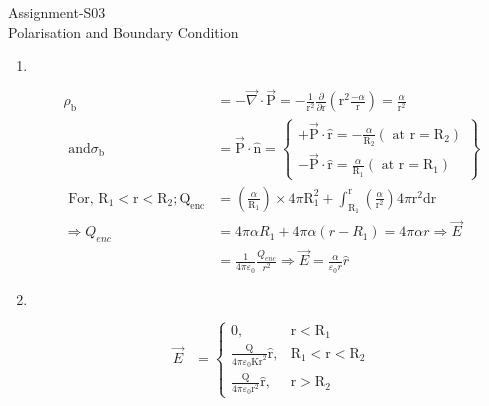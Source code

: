 \begin{abox}
	Assignment-S03\\
	\vspace{0.5cm}
	 Polarisation and Boundary Condition
	\end{abox}
\begin{enumerate}
	\item $\left. \right. $
	\begin{answer}
		\begin{align*}
		\rho_{\mathrm{b}}&=-\vec{\nabla} \cdot \overrightarrow{\mathrm{P}}=-\frac{1}{\mathrm{r}^{2}} \frac{\partial}{\partial \mathrm{r}}\left(\mathrm{r}^{2} \frac{-\alpha}{\mathrm{r}}\right)=\frac{\alpha}{\mathrm{r}^{2}}\\\text{ and} \sigma_{\mathrm{b}}&=\overrightarrow{\mathrm{P}} \cdot \hat{\mathrm{n}}=\left\{\begin{array}{l}+\overrightarrow{\mathrm{P}} \cdot \hat{\mathrm{r}}=-\frac{\alpha}{\mathrm{R}_{2}}\left(\text { at } \mathrm{r}=\mathrm{R}_{2}\right) \\ -\overrightarrow{\mathrm{P}} \cdot \hat{\mathrm{r}}=\frac{\alpha}{\mathrm{R}_{1}}\left(\text { at } \mathrm{r}=\mathrm{R}_{1}\right)\end{array}\right\}\\
	\text{	For, }\mathrm{R}_{1}<\mathrm{r}<\mathrm{R}_{2} ; \mathrm{Q}_{\mathrm{enc}}&=\left(\frac{\alpha}{\mathrm{R}_{1}}\right) \times 4 \pi \mathrm{R}_{1}^{2}+\int_{\mathrm{R}_{1}}^{\mathrm{r}}\left(\frac{\alpha}{\mathrm{r}^{2}}\right) 4 \pi \mathrm{r}^{2} \mathrm{dr}\\
		\Rightarrow Q_{e n c}&=4 \pi \alpha R_{1}+4 \pi \alpha\left(r-R_{1}\right)=4 \pi \alpha r \Rightarrow \vec{E}\\&=\frac{1}{4 \pi \varepsilon_{0}} \frac{Q_{e n c}}{r^{2}} \Rightarrow \vec{E}=\frac{\alpha}{\varepsilon_{0} r} \hat{r}
		\end{align*}
	\end{answer}
	\item $\left. \right. $
	\begin{answer}
		\begin{align*}
		\vec{E}&=\left\{\begin{array}{ll}0, & \mathrm{r}<\mathrm{R}_{1} \\ \frac{\mathrm{Q}}{4 \pi \varepsilon_{0} \mathrm{Kr}^{2}} \hat{\mathrm{r}}, & \mathrm{R}_{1}<\mathrm{r}<\mathrm{R}_{2} \\ \frac{\mathrm{Q}}{4 \pi \varepsilon_{0} \mathrm{r}^{2}} \hat{\mathrm{r}}, & \mathrm{r}>\mathrm{R}_{2}\end{array}\right.\\

\end{align*}
\end{answer}
\end{enumerate}
